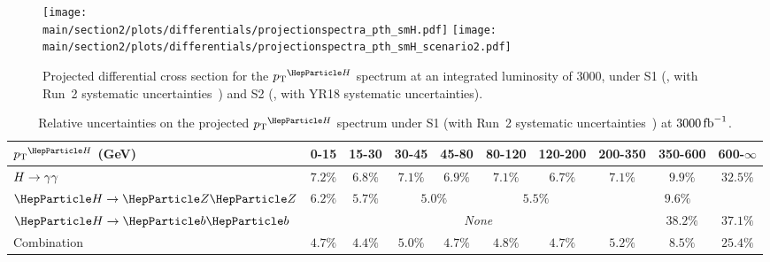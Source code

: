 \begin{figure}%
  \begin{center}
    \texttt{[image: \\main/section2/plots/differentials/projectionspectra\_pth\_smH.pdf]}
    \texttt{[image: \\main/section2/plots/differentials/projectionspectra\_pth\_smH\_scenario2.pdf]}
    \caption{
        Projected differential cross section for the $\pTH$ spectrum at an integrated luminosity of 3000\fbinv, under S1 (\UcmsLeft, with Run~2 systematic uncertainties~\cite{CMS-PAS-HIG-17-028}) and S2 (\UcmsRight, with YR18 systematic uncertainties).
        }
    \label{fig:proj_pth}
  \end{center}
\end{figure}

\begin{table}%
\footnotesize
\begin{center}
\begin{tabular}{l|c|c|c|c|c|c|c|c|c}
$\pTH$ (GeV)       & 0-15    &  15-30   &  30-45    &  45-80   &  80-120  &  120-200  &  200-350  &  350-600  &  600-$\infty$  \\
\hline
$H\rightarrow\gamma\gamma$       & $7.2\%$ & $6.8\%$ & $7.1\%$ & $6.9\%$            & $7.1\%$ & $6.7\%$            & $7.1\%$ & $9.9\%$  & $32.5\%$ \\ 
$\hzz$       & $6.2\%$ & $5.7\%$ & \multicolumn{2}{c|}{$5.0\%$} & \multicolumn{2}{c|}{$5.5\%$} & \multicolumn{3}{c}{$9.6\%$} \\ 
$\hbb$       & \multicolumn{7}{c|}{\textit{None}}                                              & $38.2\%$ & $37.1\%$ \\ 
Combination  & $4.7\%$ & $4.4\%$ & $5.0\%$ & $4.7\%$            & $4.8\%$ & $4.7\%$            & $5.2\%$ & $8.5\%$  & $25.4\%$ \\
\end{tabular}
\end{center}
\caption{
    Relative uncertainties on the projected $\pTH$ spectrum under S1 (with Run~2 systematic uncertainties~\cite{CMS-PAS-HIG-17-028}) at $3000\mbox{\ensuremath{\,\text{fb}^\text{$-$1}}}$.
    }
\label{tab:proj_pth_unc_scen1}
\end{table}

